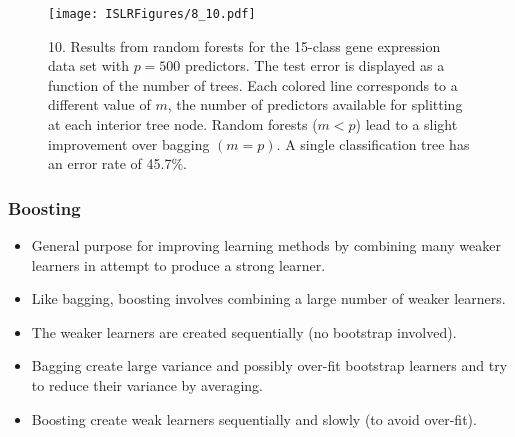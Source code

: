 \documentclass{beamer}
\begin{document}
                     \begin{frame}
                      
                     	\begin{figure}
                     		\centering
                     		
                     		\centering
                     		\texttt{[image: ISLRFigures/8\_10.pdf]}
                     		\caption{\scriptsize 10. Results from random forests for the 15-class gene expression
                     			data set with $p = 500$ predictors. The test error is displayed as a function of
                     			the number of trees. Each colored line corresponds to a different value of $m$, the
                     			number of predictors available for splitting at each interior tree node. Random
                     			forests ($m < p$) lead to a slight improvement over bagging $(m=p)$. A single
                     			classification tree has an error rate of 45.7\%.
                     		}
                     	\end{figure}
                     \end{frame}
                     
                          
                     
                     \begin{frame}
                     	\frametitle{Boosting}
                     	\begin{itemize}
                     		\item General purpose for improving learning methods by combining many weaker learners in attempt to produce a strong learner.
                     		\item Like bagging, boosting involves combining
                     		a large number of weaker learners.
                     		\item The weaker learners are created sequentially (no bootstrap involved).
                     		\item   Bagging create large variance and possibly 
                     		over-fit bootstrap learners and try to reduce their variance by averaging.
                     		\item  Boosting create weak learners sequentially and slowly (to avoid over-fit).
                     
                     	\end{itemize}
                     \end{frame} 
\end{document}
